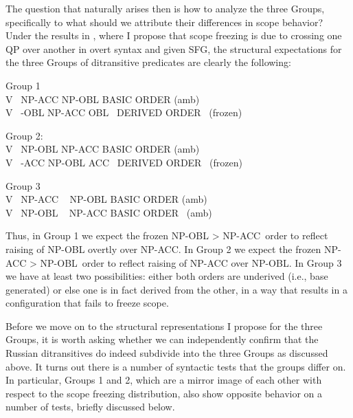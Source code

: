 \documentclass[output=paper,colorlinks,citecolor=brown,modfonts,nonflat]{langsci/langscibook}
\begin{document}
The question that naturally arises then is how to analyze the three Groups, specifically to what should we attribute their differences in scope behavior? Under the results in \citet{Antonyuk2015}, where I propose that scope freezing is due to crossing one QP over another in overt syntax and given SFG, the structural expectations for the three Groups of ditransitive predicates are clearly the following:


\ea%
    \label{ex:antonyuk:19}
    Group 1\\
V ~NP-ACC NP-OBL                               \hfill   BASIC ORDER (amb)\\
V ~-OBL NP-ACC OBL~  \hfill  DERIVED ORDER ~(frozen)\\
    \z
{}

\ea%
    \label{ex:antonyuk:20}
    Group 2:\\
V ~NP-OBL   NP-ACC                                 \hfill BASIC ORDER (amb)\\
V ~-ACC   NP-OBL ACC~   \hfill DERIVED ORDER ~(frozen)\\
    \z
{}

\ea%
    \label{ex:antonyuk:21}
    Group 3\\
V ~NP-ACC ~ NP-OBL      \hfill BASIC ORDER (amb)\\
V ~NP-OBL ~ NP-ACC    \hfill   BASIC ORDER ~(amb)
    \z

Thus, in Group 1 we expect the frozen NP-OBL > NP-ACC~order to reflect raising of NP-OBL overtly over NP-ACC. In Group 2 we expect the frozen NP-ACC > NP-OBL~order to reflect raising of NP-ACC over NP-OBL.  In Group 3 we have at least two possibilities: either both orders are underived (i.e., base generated) or else one is in fact derived from the other, in a way that results in a configuration that fails to freeze scope.

Before we move on to the structural representations I propose for the three Groups, it is worth asking whether we can independently confirm that the Russian ditransitives do indeed subdivide into the three Groups as discussed above. It turns out there is a number of syntactic tests that the groups differ on. In particular, Groups 1 and 2, which are a mirror image of each other with respect to the scope freezing distribution, also show opposite behavior on a number of tests, briefly discussed below.
\end{document}
